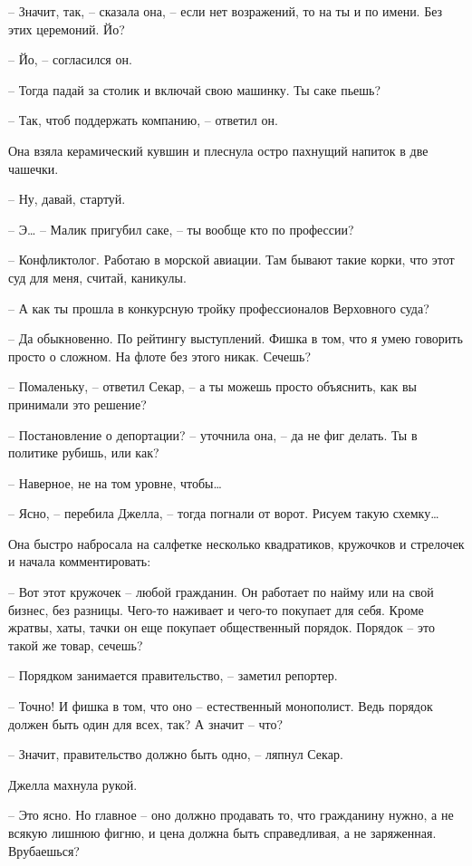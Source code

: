 -- Значит, так, -- сказала она, -- если нет возражений, то на ты и по имени. Без этих церемоний. Йо?

-- Йо, -- согласился он.

-- Тогда падай за столик и включай свою машинку. Ты саке пьешь?

-- Так, чтоб поддержать компанию, -- ответил он.

Она взяла керамический кувшин и плеснула остро пахнущий напиток в две чашечки.

-- Ну, давай, стартуй.

-- Э\ldots{} -- Малик пригубил саке, -- ты вообще кто по профессии?

-- Конфликтолог. Работаю в морской авиации. Там бывают такие корки, что этот суд для меня, считай, каникулы.

-- А как ты прошла в конкурсную тройку профессионалов Верховного суда?

-- Да обыкновенно. По рейтингу выступлений. Фишка в том, что я умею говорить просто о сложном. На флоте без этого никак. Сечешь?

-- Помаленьку, -- ответил Секар, -- а ты можешь просто объяснить, как вы принимали это решение?

-- Постановление о депортации? -- уточнила она, -- да не фиг делать. Ты в политике рубишь, или как?

-- Наверное, не на том уровне, чтобы\ldots{}

-- Ясно, -- перебила Джелла, -- тогда погнали от ворот. Рисуем такую схемку\ldots{}

Она быстро набросала на салфетке несколько квадратиков, кружочков и стрелочек и начала комментировать:

-- Вот этот кружочек -- любой гражданин. Он работает по найму или на свой бизнес, без разницы. Чего-то наживает и чего-то покупает для себя. Кроме жратвы, хаты, тачки он еще покупает общественный порядок. Порядок -- это такой же товар, сечешь?

-- Порядком занимается правительство, -- заметил репортер.

-- Точно! И фишка в том, что оно -- естественный монополист. Ведь порядок должен быть один для всех, так? А значит -- что?

-- Значит, правительство должно быть одно, -- ляпнул Секар.

Джелла махнула рукой.

-- Это ясно. Но главное -- оно должно продавать то, что гражданину нужно, а не всякую лишнюю фигню, и цена должна быть справедливая, а не заряженная. Врубаешься?

